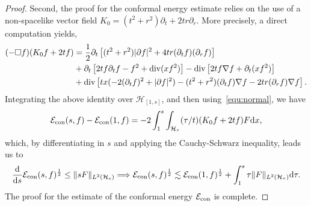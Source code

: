 \documentclass[a4paper,reqno]{amsart}
\theoremstyle{definition}
\numberwithin{equation}{section}
\def \d {{\rm{d}}}
\def \pt{\partial_{t}}
\def \pr{\partial_{r}}
\begin{document}
\begin{proof}
         \smallskip
         Second, the proof for the conformal energy estimate relies on the use of a non-spacelike vector field $K_{0}=(t^{2}+r^{2})\partial_{t}+2tr\partial_{r}$. More precisely, a direct computation yields,
         \begin{equation*}
             \begin{aligned}
                ( -\Box f)(K_{0}f+2tf)
                &=
                \frac{1}{2}\partial_{t}\left[
                (t^{2}+r^{2})|\partial f|^{2}+4tr(\pt f)(\pr f)
                \right]\\
                &+\pt \left[
                2tf\pt f-f^{2}+{\rm{div}}(xf^{2})
                \right]
                -{\rm{div}}\left[
                2tf\nabla f+\pt (xf^{2})
                \right]\\
                &+{\rm{div}}\left[
                tx(-2(\pt f)^{2}+|\partial f|^{2})
                -(t^{2}+r^{2})(\pt f)\nabla f-2tr (\pr f)\nabla f
                \right].
             \end{aligned}
         \end{equation*}
         Integrating the above identity over $\mathcal{H}_{[1,s]}$, and then using~\eqref{equ:normal}, we have 
         \begin{equation*}
             \mathcal{E}_{\rm{con}}(s,f)-\mathcal{E}_{\rm{con}}(1,f)=-2\int_{1}^{s}\int_{\mathcal{H}_{\tau}}(\tau/t)(K_{0}f+2tf)F\d x,
         \end{equation*}
          which, by differentiating in $s$ and applying the Cauchy-Schwarz inequality, leads us to
          \begin{equation*}
         {{\mathrm{d}\over \mathrm{d}s}}\mathcal{E}_{\rm{con}}(s,f)^{1\over 2}
             \leq \|sF\|_{L^{2}{(\mathcal{H}_{s})}}\Longrightarrow 
             \mathcal{E}_{\rm{con}}(s,f)^{\frac{1}{2}} \lesssim
     \mathcal{E}_{\rm{con}}(1,f)^{\frac{1}{2}}+\int_{1}^{s}\tau\|F\|_{L^{2}(\mathcal{H}_{\tau})}\mathrm{d} \tau.
         \end{equation*}  
         The proof for the estimate of the conformal energy $\mathcal{E}_{\rm{con}}$ is complete.
     \end{proof}
\end{document}
